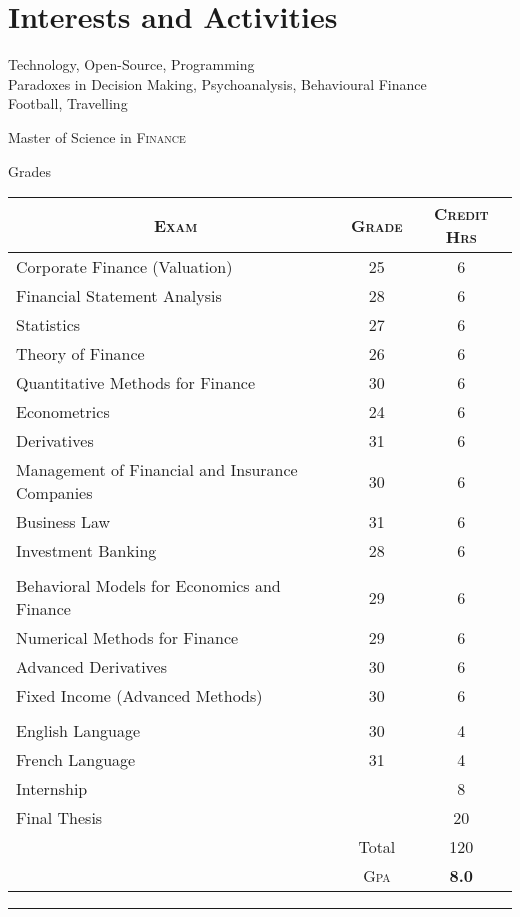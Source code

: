 \documentclass[a4paper,10pt]{article} %
\begin{document}
\section{Interests and Activities}

Technology, Open-Source, Programming\\
Paradoxes in Decision Making, Psychoanalysis, Behavioural Finance\\
Football, Travelling


\newpage


\par{\centering\Large \hypertarget{grds}{Master of Science in \textsc{Finance}}\par}\large{\centering Grades\par}\normalsize

\begin{center}
\begin{tabular}{lcc}
\multicolumn{1}{c}{\textsc{Exam}} & \textsc{Grade}&\textsc{Credit Hrs}\\ \hline
Corporate Finance (Valuation) & 25 & 6\\
Financial Statement Analysis & 28 & 6\\
Statistics & 27 & 6\\
Theory of Finance & 26 & 6\\
Quantitative Methods for Finance & 30 & 6\\
Econometrics & 24 & 6\\
Derivatives & 31 & 6\\
Management of Financial and Insurance Companies & 30 & 6\\
Business Law & 31 & 6\\
Investment Banking	& 28 & 6\\ \\
Behavioral Models for Economics and Finance	 & 29 & 6\\
Numerical Methods for Finance & 29 & 6\\
Advanced Derivatives & 30 & 6\\
Fixed Income (Advanced Methods) & 30 & 6\\ \\
English Language & 30 &	4\\
French Language & 31 &	4\\
Internship & & 8\\
Final Thesis & & 20\\
& Total & 120\\\cline{2-3}
&\textsc{Gpa}&\textbf{8.0}
\end{tabular}
\end{center}
\bigskip
\hrule
\bigskip
\end{document}
